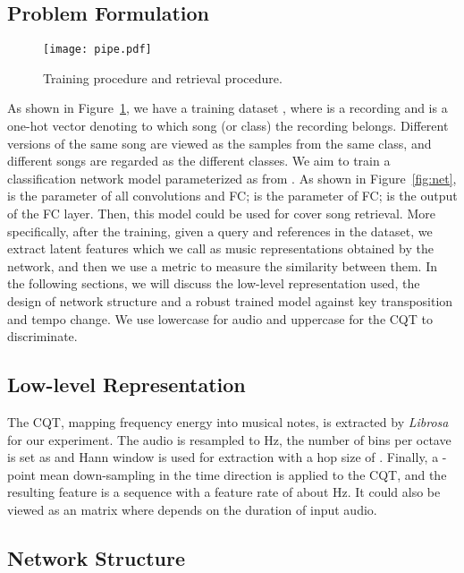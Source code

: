 \documentclass{article}
\newcommand{\figref}[1]{\mbox{Figure~\ref{#1}}}
\begin{document}
\subsection{Problem Formulation}
\begin{figure}
	\centering
	\texttt{[image: pipe.pdf]}
	\caption{Training procedure and retrieval procedure.}
	\label{fig:pipe}
\end{figure}
As shown in \figref{fig:pipe}, we have a training dataset , where  is a recording and  is a one-hot vector denoting to which song (or class) the recording belongs. Different versions of the same song are viewed as the samples from the same class, and different songs are regarded as the different classes. We aim to train a classification network model parameterized as  from . As shown in \figref{fig:net},  is the parameter of all convolutions and FC;  is the parameter of FC;  is the output of the FC layer. Then, this model could be used for cover song retrieval. More specifically, after the training, given a query  and references  in the dataset, we extract latent features  which we call as music representations obtained by the network, and then we use a metric  to measure the similarity between them. In the following sections, we will discuss the low-level representation used, the design of network structure and a robust trained model against key transposition and tempo change. We use lowercase for audio and uppercase for the CQT to discriminate.



\subsection{Low-level Representation}
The CQT, mapping frequency energy into musical notes, is extracted by \textit{Librosa} \cite{mcfee2015librosa} for our experiment. The audio is resampled to  Hz, the number of bins per octave is set as  and Hann window is used for extraction with a hop size of . Finally, a -point mean down-sampling in the time direction is applied to the CQT, and the resulting feature is a sequence with a feature rate of about  Hz. It could also be viewed as an  matrix where  depends on the duration of input audio.












\subsection{Network Structure}
\end{document}
